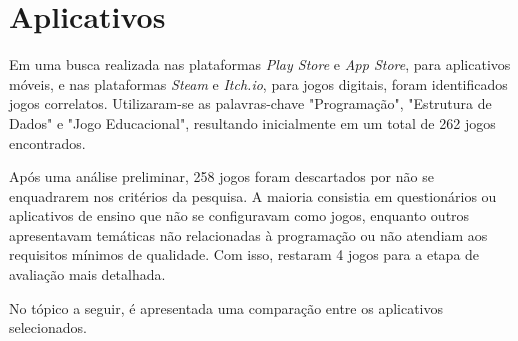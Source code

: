 \section{Aplicativos}

Em uma busca realizada nas plataformas \emph{Play Store} e \emph{App Store},
para aplicativos móveis, e nas plataformas \emph{Steam} e \emph{Itch.io}, para
jogos digitais, foram identificados jogos correlatos. Utilizaram-se as
palavras-chave "Programação", "Estrutura de Dados" e "Jogo Educacional",
resultando inicialmente em um total de 262 jogos encontrados.

Após uma análise preliminar, 258 jogos foram descartados por não se enquadrarem
nos critérios da pesquisa. A maioria consistia em questionários ou aplicativos
de ensino que não se configuravam como jogos, enquanto outros apresentavam
temáticas não relacionadas à programação ou não atendiam aos requisitos mínimos
de qualidade. Com isso, restaram 4 jogos para a etapa de avaliação mais
detalhada.

\begin{enumerate}
  
  
  
  
\end{enumerate}

No tópico a seguir, é apresentada uma comparação entre os aplicativos selecionados.


